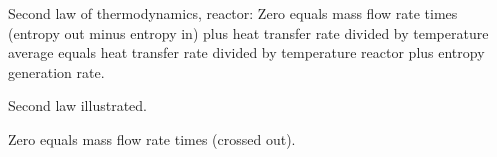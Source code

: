 Second law of thermodynamics, reactor:
Zero equals mass flow rate times (entropy out minus entropy in) plus heat transfer rate divided by temperature average equals heat transfer rate divided by temperature reactor plus entropy generation rate.

Second law illustrated.

Zero equals mass flow rate times (crossed out).